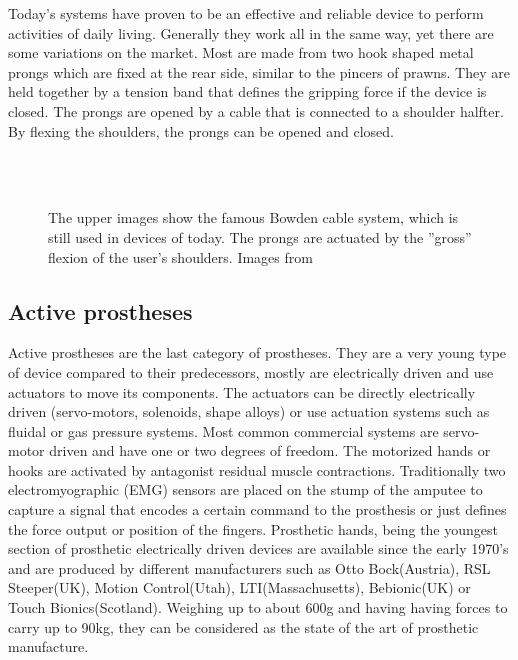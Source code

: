 \documentclass[main]{subfiles}
\begin{document}
Today's systems have proven to be an effective and reliable device to perform activities of daily living. Generally they work all in the same way, yet there are some variations on the market. Most are made from two hook shaped metal prongs which are fixed at the rear side, similar to the pincers of prawns. They are held together by a tension band that defines the gripping force if the device is closed. The prongs are opened by a cable that is connected to a shoulder halfter. By flexing the shoulders, the prongs can be opened and closed.

\begin{figure}[H]
\centering
{}\\
\hspace{0.15\textwidth}
\\
\caption[Bowden cable system]{The upper images show the famous Bowden cable system, which is still used in devices of today. The prongs are actuated by the  ''gross'' flexion of the user's shoulders. Images from \cite{Billock1986,amputee-coalition}}
\label{body-powered system}
\end{figure}

\subsection{Active prostheses}
Active prostheses are the last category of prostheses. They are a very young type of device compared to their predecessors, mostly are electrically driven and use actuators to move its components. The actuators can be directly electrically driven (servo-motors, solenoids, shape alloys) or use actuation systems such as fluidal or gas pressure systems. Most common commercial systems are servo-motor driven and have one or two degrees of freedom. The motorized hands or hooks are activated by antagonist residual muscle contractions. Traditionally two electromyographic (EMG) sensors are placed on the stump of the amputee to capture a signal that encodes a certain command to the prosthesis or just defines the force output or position of the fingers. Prosthetic hands, being the youngest section of prosthetic electrically driven devices are available since the early 1970's and are produced by different manufacturers such as Otto Bock(Austria), RSL Steeper(UK), Motion Control(Utah), LTI(Massachusetts), Bebionic(UK) or Touch Bionics(Scotland). Weighing up to about 600g and having having forces to carry up to 90kg, they can be considered as the state of the art of prosthetic manufacture. 
\end{document}
